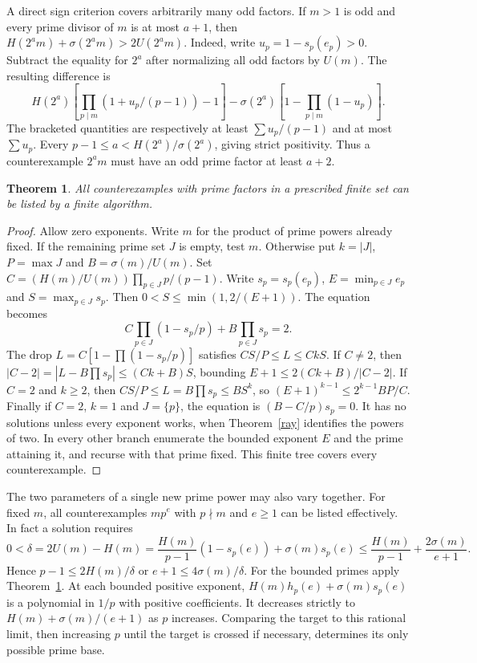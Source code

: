 \documentclass[11pt]{article}
\newtheorem{theorem}{Theorem}\newtheorem{lemma}[theorem]{Lemma}
\begin{document}
A direct sign criterion covers arbitrarily many odd factors. If $m>1$ is odd and every prime divisor of $m$ is at most $a+1$, then $H(2^a m)+\sigma(2^a m)>2U(2^a m)$. Indeed, write $u_p=1-s_p(e_p)>0$. Subtract the equality for $2^a$ after normalizing all odd factors by $U(m)$. The resulting difference is
\[
 H(2^a)\left[\prod_{p\mid m}(1+u_p/(p-1))-1\right]
 -\sigma(2^a)\left[1-\prod_{p\mid m}(1-u_p)\right].
\]
The bracketed quantities are respectively at least $\sum u_p/(p-1)$ and at most $\sum u_p$. Every $p-1\le a<H(2^a)/\sigma(2^a)$, giving strict positivity. Thus a counterexample $2^am$ must have an odd prime factor at least $a+2$.

\begin{theorem}\label{support}
All counterexamples with prime factors in a prescribed finite set can be listed by a finite algorithm.
\end{theorem}
\begin{proof}
Allow zero exponents. Write $m$ for the product of prime powers already fixed. If the remaining prime set $J$ is empty, test $m$. Otherwise put $k=|J|$, $P=\max J$ and $B=\sigma(m)/U(m)$. Set $C=(H(m)/U(m))\prod_{p\in J}p/(p-1)$. Write $s_p=s_p(e_p)$, $E=\min_{p\in J}e_p$ and $S=\max_{p\in J}s_p$. Then $0<S\le\min(1,2/(E+1))$. The equation becomes
\[
 C\prod_{p\in J}(1-s_p/p)+B\prod_{p\in J}s_p=2.
\]
The drop $L=C[1-\prod(1-s_p/p)]$ satisfies $CS/P\le L\le CkS$. If $C\ne2$, then $|C-2|=|L-B\prod s_p|\le(Ck+B)S$, bounding $E+1\le 2(Ck+B)/|C-2|$. If $C=2$ and $k\ge2$, then $CS/P\le L=B\prod s_p\le BS^k$, so $(E+1)^{k-1}\le 2^{k-1}BP/C$. Finally if $C=2$, $k=1$ and $J=\{p\}$, the equation is $(B-C/p)s_p=0$. It has no solutions unless every exponent works, when Theorem~\ref{ray} identifies the powers of two. In every other branch enumerate the bounded exponent $E$ and the prime attaining it, and recurse with that prime fixed. This finite tree covers every counterexample.
\end{proof}

The two parameters of a single new prime power may also vary together.
For fixed $m$, all counterexamples $mp^e$ with $p\nmid m$ and $e\ge1$ can be listed effectively. In fact a solution requires
\[
 0<\delta=2U(m)-H(m)=\frac{H(m)}{p-1}(1-s_p(e))+\sigma(m)s_p(e)
 \le\frac{H(m)}{p-1}+\frac{2\sigma(m)}{e+1}.
\]
Hence $p-1\le2H(m)/\delta$ or $e+1\le4\sigma(m)/\delta$. For the bounded primes apply Theorem~\ref{support}. At each bounded positive exponent, $H(m)h_p(e)+\sigma(m)s_p(e)$ is a polynomial in $1/p$ with positive coefficients. It decreases strictly to $H(m)+\sigma(m)/(e+1)$ as $p$ increases. Comparing the target to this rational limit, then increasing $p$ until the target is crossed if necessary, determines its only possible prime base.
\end{document}
